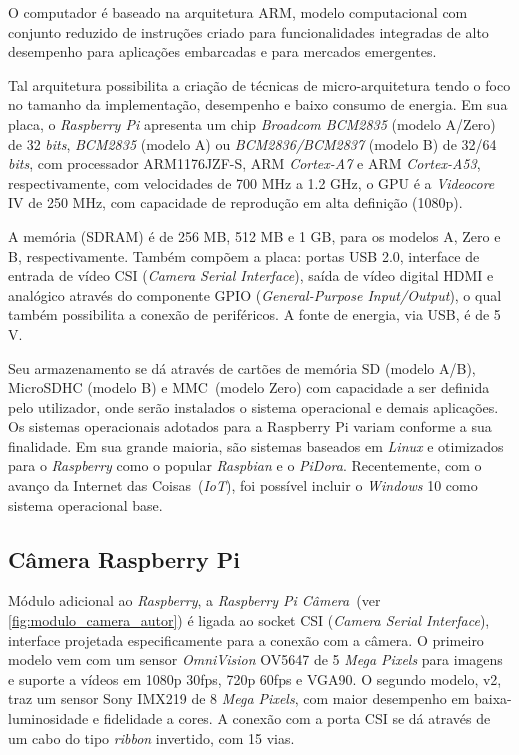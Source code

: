 \documentclass[12pt,oneside,a4paper,chapter=TITLE,section=TITLE,sumario=tradicional]{abntex2}
\begin{document}
O computador é baseado na arquitetura ARM, modelo computacional com conjunto reduzido de instruções criado para funcionalidades integradas de alto desempenho para aplicações embarcadas e para mercados emergentes.

Tal arquitetura possibilita a criação de técnicas de micro-arquitetura tendo o foco no tamanho da implementação, desempenho e baixo consumo de energia. Em sua placa, o \textit{Raspberry Pi} apresenta um chip \textit{Broadcom BCM2835} (modelo A/Zero) de 32 \textit{bits}, \textit{BCM2835} (modelo A) ou \textit{BCM2836/BCM2837} (modelo B) de 32/64 \textit{bits}, com processador ARM1176JZF-S, ARM \textit{Cortex-A7} e ARM \textit{Cortex-A53}, respectivamente, com velocidades de 700 MHz a 1.2 GHz, o GPU é a \textit{Videocore} IV de 250 MHz, com capacidade de reprodução em alta definição (1080p). 

A memória (SDRAM) é de 256 MB, 512 MB e 1 GB, para os modelos A, Zero e B, respectivamente. Também compõem a placa: portas USB 2.0, interface de entrada de vídeo CSI (\textit{Camera Serial Interface}), saída de vídeo digital HDMI e analógico através do componente GPIO (\textit{General-Purpose Input/Output}), o qual também possibilita a conexão de periféricos. A fonte de energia, via USB, é de 5 V.

Seu armazenamento se dá através de cartões de memória SD (modelo A/B), MicroSDHC (modelo B) e MMC~(modelo Zero) com capacidade a ser definida pelo utilizador, onde serão instalados o sistema operacional e demais aplicações.
Os sistemas operacionais adotados para a Raspberry Pi variam conforme a sua finalidade. Em sua grande maioria, são sistemas baseados em \textit{Linux} e otimizados para o \textit{Raspberry} como o popular \textit{Raspbian} e o \textit{PiDora}. Recentemente, com o avanço da Internet das Coisas~(\textit{IoT}), foi possível incluir o \textit{Windows} 10 como sistema operacional base.

\subsection{Câmera Raspberry Pi}

Módulo adicional ao \textit{Raspberry}, a \textit{Raspberry Pi Câmera}~(ver \autoref{fig:modulo_camera_autor}) é ligada ao socket CSI (\textit{Camera Serial Interface}), interface projetada especificamente para a conexão com a câmera. O primeiro modelo vem com um sensor \textit{OmniVision} OV5647 de 5 \textit{Mega Pixels} para imagens e suporte a vídeos em 1080p 30fps, 720p 60fps e VGA90. O segundo modelo, v2, traz um sensor Sony IMX219 de 8 \textit{Mega Pixels}, com maior desempenho em baixa-luminosidade e fidelidade a cores. A conexão com a porta CSI se dá através de um cabo do tipo \textit{ribbon} invertido, com 15 vias.
\end{document}
